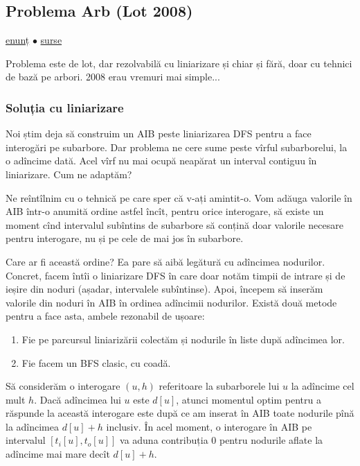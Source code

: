 \documentclass[../main.tex]{subfiles}
\begin{document}
\subsection{Problema Arb (Lot 2008)}
\label{problem:arb}

\href{https://kilonova.ro/problems/2333}{enunț}
$\bullet$
\hyperref[code:arb]{surse}

Problema este de lot, dar rezolvabilă cu liniarizare și chiar și fără, doar cu tehnici de bază pe arbori. 2008 erau vremuri mai simple...

\subsubsection*{Soluția cu liniarizare}

Noi știm deja să construim un AIB peste liniarizarea DFS pentru a face interogări pe subarbore. Dar problema ne cere sume peste vîrful subarborelui, la o adîncime dată. Acel vîrf nu mai ocupă neapărat un interval contiguu în liniarizare. Cum ne adaptăm?

Ne reîntîlnim cu o tehnică pe care sper că v-ați amintit-o. Vom adăuga valorile în AIB într-o anumită ordine astfel încît, pentru orice interogare, să existe un moment cînd intervalul subîntins de subarbore să conțină doar valorile necesare pentru interogare, nu și pe cele de mai jos în subarbore.

Care ar fi această ordine? Ea pare să aibă legătură cu adîncimea nodurilor. Concret, facem întîi o liniarizare DFS în care doar notăm timpii de intrare și de ieșire din noduri (așadar, intervalele subîntinse). Apoi, începem să inserăm valorile din noduri în AIB în ordinea adîncimii nodurilor. Există două metode pentru a face asta, ambele rezonabil de ușoare:

\begin{enumerate}
  \item Fie pe parcursul liniarizării colectăm și nodurile în liste după adîncimea lor.
  \item Fie facem un BFS clasic, cu coadă.
\end{enumerate}

Să considerăm o interogare $(u, h)$ referitoare la subarborele lui $u$ la adîncime cel mult $h$. Dacă adîncimea lui $u$ este $d[u]$, atunci momentul optim pentru a răspunde la această interogare este după ce am inserat în AIB toate nodurile pînă la adîncimea $d[u] + h$ inclusiv. În acel moment, o interogare în AIB pe intervalul $[t_i[u], t_o[u]]$ va aduna contribuția 0 pentru nodurile aflate la adîncime mai mare decît $d[u] + h$.
\end{document}
